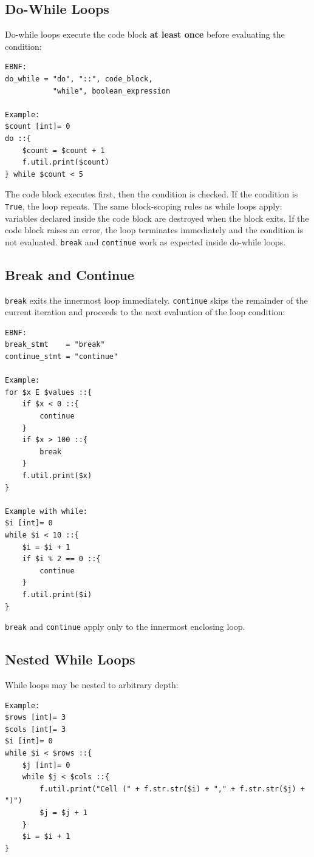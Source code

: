 \subsection{Do-While Loops}
Do-while loops execute the code block \textbf{at least once} before evaluating the condition:
\begin{verbatim}
EBNF:
do_while = "do", "::", code_block,
           "while", boolean_expression

Example:
$count [int]= 0
do ::{
    $count = $count + 1
    f.util.print($count)
} while $count < 5
\end{verbatim}
The code block executes first, then the condition is checked. If the condition is \texttt{True}, the loop repeats. The same block-scoping rules as while loops apply: variables declared inside the code block are destroyed when the block exits. If the code block raises an error, the loop terminates immediately and the condition is not evaluated. \texttt{break} and \texttt{continue} work as expected inside do-while loops.

\subsection{Break and Continue}
\texttt{break} exits the innermost loop immediately. \texttt{continue} skips the remainder of the current iteration and proceeds to the next evaluation of the loop condition:
\begin{verbatim}
EBNF:
break_stmt    = "break"
continue_stmt = "continue"

Example:
for $x E $values ::{
    if $x < 0 ::{
        continue
    }
    if $x > 100 ::{
        break
    }
    f.util.print($x)
}

Example with while:
$i [int]= 0
while $i < 10 ::{
    $i = $i + 1
    if $i % 2 == 0 ::{
        continue
    }
    f.util.print($i)
}
\end{verbatim}
\texttt{break} and \texttt{continue} apply only to the innermost enclosing loop.

\subsection{Nested While Loops}
While loops may be nested to arbitrary depth:
\begin{verbatim}
Example:
$rows [int]= 3
$cols [int]= 3
$i [int]= 0
while $i < $rows ::{
    $j [int]= 0
    while $j < $cols ::{
        f.util.print("Cell (" + f.str.str($i) + "," + f.str.str($j) + ")")
        $j = $j + 1
    }
    $i = $i + 1
}
\end{verbatim}

